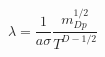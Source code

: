 \begin{equation}
\lambda = \frac{1}{a \sigma} \frac{m_{Dp}^{1/2}}{T^{D-1/2}}
\label{lambda}
\end{equation}

